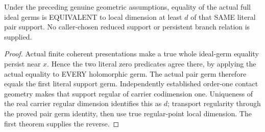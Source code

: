 \begin{theorem}
\label{hir:sharp-actual-relative-principal-germ-eq-iff-pair-dimension}
\leanok
Under the preceding genuine geometric assumptions, equality of the actual
full ideal germs is EQUIVALENT to local dimension at least $d$ of that SAME
literal pair support. No caller-chosen reduced support or persistent branch
relation is supplied.
\end{theorem}
\begin{proof}
Actual finite coherent presentations make a true whole ideal-germ equality
persist near $x$. Hence the two literal zero predicates agree there, by
applying the actual equality to EVERY holomorphic germ. The actual pair germ
therefore equals the first literal support germ. Independently established
order-one contact geometry makes that support regular of carrier codimension
one. Uniqueness of the real carrier regular dimension identifies this as
$d$; transport regularity through the proved pair germ identity, then use
true regular-point local dimension. The first theorem supplies the reverse.
\end{proof}

